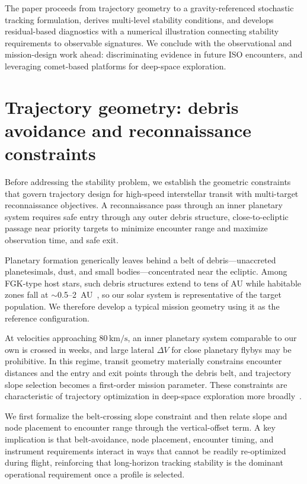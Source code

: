 \documentclass{article}
\begin{document}
The paper proceeds from trajectory geometry to a gravity-referenced stochastic tracking formulation, derives multi-level stability conditions, and develops residual-based diagnostics with a numerical illustration connecting stability requirements to observable signatures. We conclude with the observational and mission-design work ahead: discriminating evidence in future ISO encounters, and leveraging comet-based platforms for deep-space exploration.



\section{Trajectory geometry: debris avoidance and reconnaissance constraints}
\label{sec:trajectory_geometry}

Before addressing the stability problem, we establish the geometric constraints that govern trajectory design for high-speed interstellar transit with multi-target reconnaissance objectives. A reconnaissance pass through an inner planetary system requires safe entry through any outer debris structure, close-to-ecliptic passage near priority targets to minimize encounter range and maximize observation time, and safe exit.

Planetary formation generically leaves behind a belt of debris---unaccreted planetesimals, dust, and small bodies---concentrated near the ecliptic. Among FGK-type host stars, such debris structures extend to tens of AU while habitable zones fall at $\sim$0.5--2~AU~\cite{wyatt2008debris_disks,hughes2018debris}, so our solar system is representative of the target population. We therefore develop a typical mission geometry using it as the reference configuration.

At velocities approaching $80\,\mathrm{km/s}$, an inner planetary system comparable to our own is crossed in weeks, and large lateral $\Delta V$ for close planetary flybys may be prohibitive. In this regime, transit geometry materially constrains encounter distances and the entry and exit points through the debris belt, and trajectory slope selection becomes a first-order mission parameter. These constraints are characteristic of trajectory optimization in deep-space exploration more broadly~\cite{li2024trajectory_mars,colombo2009lowthrust_neo}.

We first formalize the belt-crossing slope constraint and then relate slope and node placement to encounter range through the vertical-offset term. A key implication is that belt-avoidance, node placement, encounter timing, and instrument requirements interact in ways that cannot be readily re-optimized during flight, reinforcing that long-horizon tracking stability is the dominant operational requirement once a profile is selected.
\end{document}
